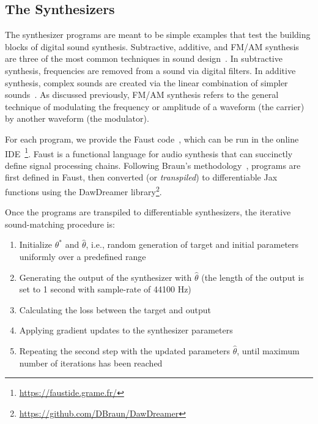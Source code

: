 \documentclass[lettersize,journal]{IEEEtran}
\begin{document}
\subsection{The Synthesizers}
\label{sec:programs}
The synthesizer programs are meant to be simple examples that test the building blocks of digital sound synthesis. Subtractive, additive, and FM/AM synthesis are three of the most common techniques in sound design~\cite{smith1991viewpoints}. In subtractive synthesis, frequencies are removed from a sound via digital filters. In additive synthesis, complex sounds are created via the linear combination of simpler sounds~\cite{lyons1997understanding,smith2007introduction}. As discussed previously, FM/AM synthesis refers to the general technique of modulating the frequency or amplitude of a waveform (the carrier) by another waveform (the modulator).

For each program, we provide the Faust code~\cite{orlarey2009faust}, which can be run in the online IDE~\footnote{\url{https://faustide.grame.fr/}}. Faust is a functional language for audio synthesis that can succinctly define signal processing chains. Following Braun's methodology~\cite{braun2024dac}, programs are first defined in Faust, then converted (or \textit{transpiled}) to differentiable Jax functions using the DawDreamer library\footnote{\url{https://github.com/DBraun/DawDreamer}}. 

 Once the programs are transpiled to differentiable synthesizers, the iterative sound-matching procedure is:
 \begin{enumerate}
    \item Initialize $\theta^*$ and $\hat{\theta}$, i.e., random generation of target and initial parameters uniformly over a predefined range
    \item Generating the output of the synthesizer with $\hat{\theta}$ (the length of the output is set to 1 second with sample-rate of 44100 Hz) 
    \item Calculating the loss between the target and output
    \item Applying gradient updates to the synthesizer parameters
    \item Repeating the second step with the updated parameters $\hat{\theta}$, until maximum number of iterations has been reached
 \end{enumerate}

\end{document}
